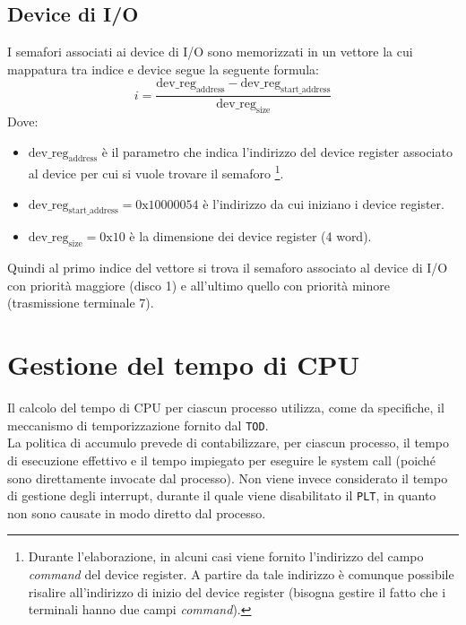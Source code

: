 \documentclass[11pt]{article}
\begin{document}
\subsection{Device di I/O}
I semafori associati ai device di I/O sono memorizzati in un vettore la cui mappatura tra indice e device segue la seguente formula:
\begin{equation}
    i = \dfrac{\text{dev\_reg}_{\text{address}} - \text{dev\_reg}_{\text{start\_address}}}{\text{dev\_reg}_{\text{size}}} 
\end{equation}
Dove:
\begin{itemize}
    \item $\text{dev\_reg}_{\text{address}}$ è il parametro che indica l'indirizzo del device register associato al device per cui si vuole trovare il semaforo
            \footnote{Durante l'elaborazione, in alcuni casi viene fornito l'indirizzo del campo \textit{command} del device register. A partire da tale indirizzo è comunque possibile risalire all'indirizzo di inizio del device register (bisogna gestire il fatto che i terminali hanno due campi \textit{command}).}.
    \item $\text{dev\_reg}_{\text{start\_address}}=0\text{x}10000054$ è l'indirizzo da cui iniziano i device register.
    \item $\text{dev\_reg}_{\text{size}}=0\text{x}10$ è la dimensione dei device register (4 word).
\end{itemize}
Quindi al primo indice del vettore si trova il semaforo associato al device di I/O con priorità maggiore (disco 1) e all'ultimo quello con priorità minore (trasmissione terminale 7).


\section{Gestione del tempo di CPU}
Il calcolo del tempo di CPU per ciascun processo utilizza, come da specifiche, il meccanismo di temporizzazione fornito dal \texttt{TOD}.\\
La politica di accumulo prevede di contabilizzare, per ciascun processo, il tempo di esecuzione effettivo e il tempo impiegato per eseguire le system call (poiché sono direttamente invocate dal processo).
Non viene invece considerato il tempo di gestione degli interrupt, durante il quale viene disabilitato il \texttt{PLT}, in quanto non sono causate in modo diretto dal processo.

\newpage
\end{document}
